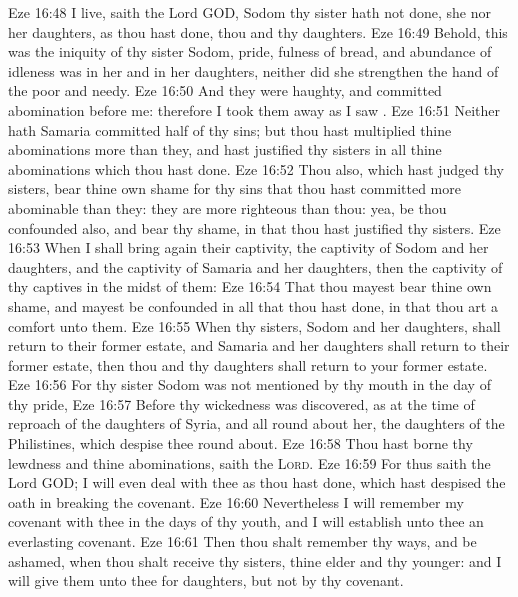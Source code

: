 \vs Eze 16:48  I live, saith the Lord GOD, Sodom thy sister hath not done, she nor her daughters, as thou hast done, thou and thy daughters.
\vs Eze 16:49 Behold, this was the iniquity of thy sister Sodom, pride, fulness of bread, and abundance of idleness was in her and in her daughters, neither did she strengthen the hand of the poor and needy.
\vs Eze 16:50 And they were haughty, and committed abomination before me: therefore I took them away as I saw .
\vs Eze 16:51 Neither hath Samaria committed half of thy sins; but thou hast multiplied thine abominations more than they, and hast justified thy sisters in all thine abominations which thou hast done.
\vs Eze 16:52 Thou also, which hast judged thy sisters, bear thine own shame for thy sins that thou hast committed more abominable than they: they are more righteous than thou: yea, be thou confounded also, and bear thy shame, in that thou hast justified thy sisters.
\vs Eze 16:53 When I shall bring again their captivity, the captivity of Sodom and her daughters, and the captivity of Samaria and her daughters, then  the captivity of thy captives in the midst of them:
\vs Eze 16:54 That thou mayest bear thine own shame, and mayest be confounded in all that thou hast done, in that thou art a comfort unto them.
\vs Eze 16:55 When thy sisters, Sodom and her daughters, shall return to their former estate, and Samaria and her daughters shall return to their former estate, then thou and thy daughters shall return to your former estate.
\vs Eze 16:56 For thy sister Sodom was not mentioned by thy mouth in the day of thy pride,
\vs Eze 16:57 Before thy wickedness was discovered, as at the time of  reproach of the daughters of Syria, and all  round about her, the daughters of the Philistines, which despise thee round about.
\vs Eze 16:58 Thou hast borne thy lewdness and thine abominations, saith the \textsc{Lord}.
\vs Eze 16:59 For thus saith the Lord GOD; I will even deal with thee as thou hast done, which hast despised the oath in breaking the covenant.
\vs Eze 16:60 Nevertheless I will remember my covenant with thee in the days of thy youth, and I will establish unto thee an everlasting covenant.
\vs Eze 16:61 Then thou shalt remember thy ways, and be ashamed, when thou shalt receive thy sisters, thine elder and thy younger: and I will give them unto thee for daughters, but not by thy covenant.
